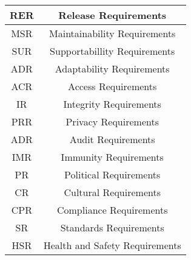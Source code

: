 \documentclass[12pt, titlepage]{article}
\begin{document}
\begin{table}[htp]
\begin{tabular}{ |c|c| }
RER & Release Requirements\\
 \hline
MSR & Maintainability Requirements\\
 \hline
SUR & Supportabillity Requirements\\
 \hline
ADR & Adaptability Requirements\\
 \hline
ACR & Access Requirements\\
 \hline
IR & Integrity Requirements\\
 \hline
PRR & Privacy Requirements\\
 \hline
ADR & Audit Requirements\\
 \hline
IMR & Immunity Requirements\\
 \hline
PR & Political Requirements\\
 \hline
CR & Cultural Requirements\\
 \hline
CPR & Compliance Requirements\\
 \hline
SR & Standards Requirements\\
 \hline
HSR & Health and Safety Requirements\\
 \hline
\end{tabular}
\end{table}
\end{document}

